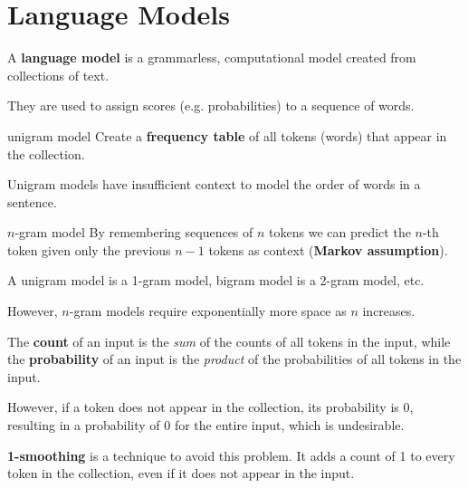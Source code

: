 \section{Language Models}

A \textbf{language model} is a grammarless, computational model created from collections of text.

They are used to assign scores (e.g. probabilities) to a sequence of words.

\begin{defn}{unigram model}
    Create a \textbf{frequency table} of all tokens (words) that appear in the collection.
\end{defn}

Unigram models have insufficient context to model the order of words in a sentence.

\begin{defn}{$n$-gram model}
    By remembering sequences of $n$ tokens we can predict the $n$-th token given only the previous $n - 1$ tokens as context (\textbf{Markov assumption}).
    
    A unigram model is a 1-gram model, bigram model is a 2-gram model, etc.

    However, $n$-gram models require exponentially more space as $n$ increases.
\end{defn}

The \textbf{count} of an input is the \textit{sum} of the counts of all tokens in the input, while the \textbf{probability} of an input is the \textit{product} of the probabilities of all tokens in the input.

However, if a token does not appear in the collection, its probability is 0,
resulting in a probability of 0 for the entire input, which is undesirable.

\textbf{1-smoothing} is a technique to avoid this problem. It adds a count of 1 to every token in the collection, even if it does not appear in the input.